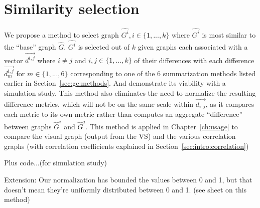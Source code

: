 \section{Similarity selection}
\label{sec:gc:examples}

We propose a method to select graph $\hat{G^i}, i \in \{1,...,k\}$ where 
$\hat{G^i}$ is most similar to the ``base'' graph $\hat{G}$. $\hat{G^i}$ is 
selected out of $k$ given graphs each associated with a vector 
$\overrightarrow{d^{i,j}}$ where $i\neq j$ and $i,j \in \{1,...,k\}$ of their 
differences with each difference $\overrightarrow{d^{i,j}_m}$ for $m \in 
\{1,...,6\}$ corresponding to one of the 6 summarization methods listed earlier 
in Section~\ref{sec:gc:methods}. And demonstrate its 
viability with a simulation study. This method also eliminates the need to 
normalize the resulting difference metrics, which will not be on the same scale 
within $\overrightarrow{d_{i,j}}$, as it compares each metric to its own metric 
rather than computes an aggregate ``difference'' between graphs $\hat{G}^i$ and 
$\hat{G}^j$.
This method is applied in Chapter~\ref{ch:usage} to compare the visual graph 
(output from the VS) and the various correlation graphs (with correlation 
coefficients explained in Section~\ref{sec:intro:correlation})



Plus code...(for simulation study)



Extension:
Our normalization has bounded the values between 0 and 1, but that doesn't mean 
they're uniformly distributed between 0 and 1. 
(see sheet on this method)